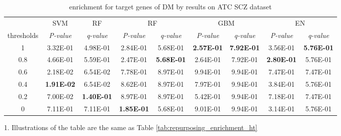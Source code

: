         \begin{table}[htbp]
          \centering
          \caption{enrichment for target genes of DM by results on ATC SCZ dataset}
          \begin{threeparttable}
            \tabcolsep=0.10cm
            \begin{tabular}{ccccccccc}
            \toprule
                  & SVM   & RF    & \multicolumn{2}{c}{RF} & \multicolumn{2}{c}{GBM} & \multicolumn{2}{c}{EN} \\
            thresholds & \textit{P-value} & \textit{q-value} & \textit{P-value} & \textit{q-value} & \textit{P-value} & \textit{q-value} & \textit{P-value} & \textit{q-value} \\
            \midrule
            1     & 3.32E-01 & 4.98E-01 & 2.84E-01 & 5.68E-01 & \textbf{2.57E-01} & \textbf{7.92E-01} & 3.56E-01 & \textbf{5.76E-01} \\
            0.8   & 4.66E-01 & 5.59E-01 & 2.47E-01 & \textbf{5.68E-01} & 2.64E-01 & 7.92E-01 & \textbf{2.80E-01} & 5.76E-01 \\
            0.6   & 2.18E-02 & 6.54E-02 & 7.78E-01 & 8.97E-01 & 9.94E-01 & 9.94E-01 & 7.47E-01 & 7.47E-01 \\
            0.4   & \textbf{1.91E-02} & 6.54E-02 & 8.62E-01 & 8.97E-01 & 7.97E-01 & 9.94E-01 & 3.84E-01 & 5.76E-01 \\
            0.2   & 7.00E-02 & \textbf{1.40E-01} & 8.97E-01 & 8.97E-01 & 5.42E-01 & 9.94E-01 & 7.18E-01 & 7.47E-01 \\
            0     & 7.11E-01 & 7.11E-01 & \textbf{1.85E-01} & 5.68E-01 & 9.01E-01 & 9.94E-01 & 3.14E-01 & 5.76E-01 \\
            \bottomrule
            \end{tabular}%
            \begin{tablenotes}
              \item 1. Illustrations of the table are the same as Table \ref{tab:repurposing_enrichment_ht}
            \end{tablenotes}
          \end{threeparttable}
          \label{tab:repurposing_enrichment_scz}%
        \end{table}%


